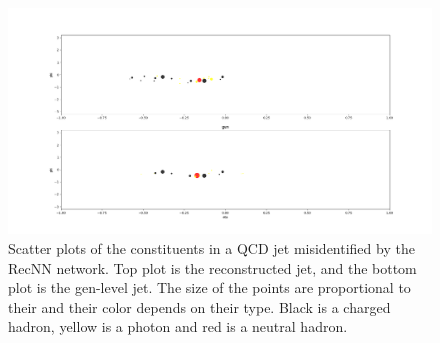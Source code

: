 \begin{figure}
    \centering
    \includegraphics[width=\textwidth]{Images/jet_display1.png}
    \caption{Scatter plots of the constituents in a QCD jet misidentified by the RecNN network. Top plot is the reconstructed jet, and the bottom plot is the gen-level jet. The size of the points are proportional to their \pt and their color depends on their type. Black is a charged hadron, yellow is a photon and red is a neutral hadron.}
    \label{fig:jet_display}
\end{figure}